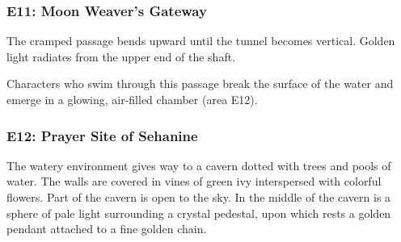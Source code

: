 \documentclass[10pt,a4,twoside,twocolumn,openany,nodeprecatedcode]{dndbook}
\begin{document}
\subsubsection{E11: Moon Weaver's Gateway}
\begin{DndReadAloud}{}
The cramped passage bends upward until the tunnel becomes vertical. Golden light radiates from the upper end of the shaft.
\end{DndReadAloud}

Characters who swim through this passage break the surface of the water and emerge in a glowing, air-filled chamber (area E12).
\subsubsection{E12: Prayer Site of Sehanine}
\begin{DndReadAloud}{}
The watery environment gives way to a cavern dotted with trees and pools of water. The walls are covered in vines of green ivy interspersed with colorful flowers. Part of the cavern is open to the sky.
In the middle of the cavern is a sphere of pale light surrounding a crystal pedestal, upon which rests a golden pendant attached to a fine golden chain.
\end{DndReadAloud}
\end{document}
